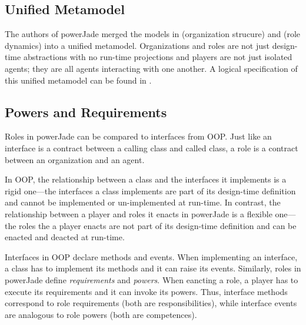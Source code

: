 \subsection*{Unified Metamodel}

The authors of powerJade merged the models in \cite{Boella04} (organization strucure) and \cite{Boella04} (role dynamics) into a unified metamodel.
Organizations and roles are not just design-time abstractions with no run-time projections and players are not just isolated agents; they are all agents interacting with one another.
A logical specification of this unified metamodel can be found in \cite{Boella07}.

\subsection*{Powers and Requirements}

Roles in powerJade can be compared to interfaces from OOP.
Just like an interface is a contract between a calling class and called class, a role is a contract between an organization and an agent.

In OOP, the relationship between a class and the interfaces it implements is a rigid one---the interfaces a class implements are part of its design-time definition and cannot be implemented or un-implemented at run-time.
In contrast, the relationship between a player and roles it enacts in powerJade is a flexible one---the roles the a player enacts are not part of its design-time definition and can be enacted and deacted at run-time.

Interfaces in OOP declare methods and events.
When implementing an interface, a class has to implement its methods and it can raise its events.
Similarly, roles in powerJade define \textit{requirements} and \textit{powers}.
When eancting a role, a player has to execute its requirements and it can invoke its powers.
Thus, interface methods correspond to role requirements (both are responsibilities), while interface events are analogous to role powers (both are competences).